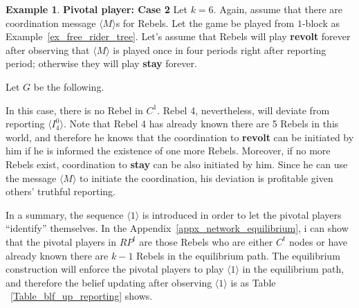 \documentclass[12pt,letter]{article}
\theoremstyle{definition}
\newtheorem{example}{Example}[section]
\theoremstyle{remark}
\theoremstyle{claim}
\begin{document}
\begin{example} \label{ex_pivotal_2}\textbf{Pivotal player: Case 2}
Let $k=6$. Again, assume that there are coordination message $\langle M\rangle$s for Rebels. Let the game be played from $1$-block as Example~\ref{ex_free_rider_tree}. Let's assume that Rebels will play \textbf{revolt} forever after observing that $\langle M \rangle$ is played once in four periods right after reporting period; otherwise they will play \textbf{stay} forever. 

Let $G$ be the following.

\begin{center}
\end{center}

In this case, there is no Rebel in $C^1$. Rebel 4, nevertheless, will deviate from reporting $\langle I^0_4 \rangle$. Note that Rebel 4 has already known there are 5 Rebels in this world, and therefore he knows that the coordination to \textbf{revolt} can be initiated by him  if he is informed the existence of one more Rebels. Moreover, if no more Rebels exist, coordination to \textbf{stay} can be also initiated by him. Since he can use the message $\langle M \rangle$ to initiate the coordination, his deviation is profitable given others' truthful reporting.
\end{example}

In a summary, the sequence $\langle 1 \rangle$ is introduced in order to let the pivotal players ``identify'' themselves. In the Appendix~\ref{appx_network_equilibrium}, i can show that the pivotal players in $RP^t$ are those Rebels who are either $C^t$ nodes or have already known there are $k-1$ Rebels in the equilibrium path. The equilibrium construction will enforce the pivotal players to play $\langle 1 \rangle$ in the equilibrium path, and therefore the belief updating after observing $\langle 1 \rangle$  is as Table ~\ref{Table_blf_up_reporting} shows.
\end{document}

